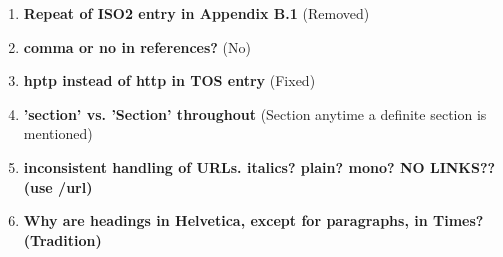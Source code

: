 \begin{enumerate}
    \item \textbf{Repeat of ISO2 entry in Appendix B.1} (Removed)
    \item \textbf{comma or no in references?} (No)
    \item \textbf{hptp instead of http in TOS entry} (Fixed)
    \item\textbf{ 'section' vs. 'Section' throughout} (Section anytime a definite section is mentioned)
    \item \textbf{inconsistent handling of URLs.  italics? plain? mono? NO LINKS??  (use /url{})}
    \item \textbf{Why are headings in Helvetica, except for paragraphs, in Times? (Tradition)}
\end{enumerate}